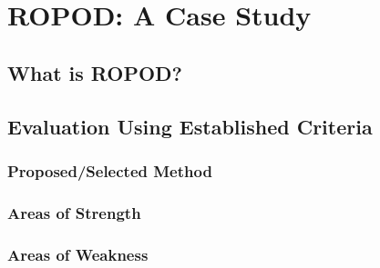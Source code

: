 
\chapter{ROPOD: A Case Study}

\section{ What is ROPOD? }


\section{ Evaluation Using Established Criteria }

\subsection{ Proposed/Selected Method }

\subsection{ Areas of Strength }

\subsection{ Areas of Weakness }

